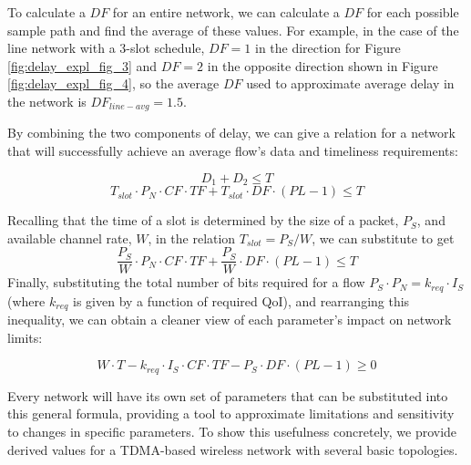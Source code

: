 To calculate a $DF$ for an entire network, we can calculate a $DF$ for each possible sample path and find the average of these values.  For example, in the case of the line network with a $3$-slot schedule, $DF = 1$ in the direction for Figure \ref{fig:delay_expl_fig_3} and $DF = 2$ in the opposite direction shown in Figure \ref{fig:delay_expl_fig_4}, so the average $DF$ used to approximate average delay in the network is $DF_{line-avg}=1.5$.  

By combining the two components of delay, we can give a relation for a network that will successfully achieve an average flow's data and timeliness requirements:

\vspace{-2mm}
\begin{equation*}
	D_1 + D_2 \leq T 
\end{equation*}
\begin{equation*}
	T_{slot} \cdot P_N \cdot CF \cdot TF + T_{slot} \cdot DF \cdot (PL-1) \leq T
\end{equation*}

Recalling that the time of a slot is determined by the size of a packet, $P_S$, and available channel rate, $W$, in the relation $T_{slot} = P_S/W$, we can substitute to get
\begin{equation*}
	\frac{P_S}{W} \cdot P_N \cdot CF \cdot TF + \frac{P_S}{W} \cdot DF \cdot (PL-1) \leq T
\end{equation*}
Finally, substituting the total number of bits required for a flow $P_S \cdot P_N =  k_{req} \cdot I_S$ (where $k_{req}$ is given by a function of required QoI), and rearranging this inequality, we can obtain a cleaner view of each parameter's impact on network limits:

\vspace{-2mm}
\begin{equation}
	W \cdot T - k_{req} \cdot I_S \cdot CF \cdot TF - P_S \cdot DF \cdot (PL-1) \geq 0	
	\label{eq:general_scal}
\end{equation}

Every network will have its own set of parameters that can be substituted into this general formula, providing a tool to approximate limitations and sensitivity to changes in specific parameters.  To show this usefulness concretely, we provide derived values for a TDMA-based wireless network with several basic topologies.


